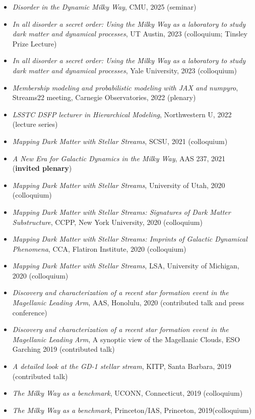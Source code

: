\documentclass[12pt, letterpaper]{apw-cv}
\begin{document}
\begin{itemize}
    \item \emph{Disorder in the Dynamic Milky Way}, CMU, 2025 (seminar)
    \item \emph{In all disorder a secret order: Using the Milky Way as a laboratory to study dark matter and dynamical processes}, UT Austin, 2023 (colloquium; Tinsley Prize Lecture)
    \item \emph{In all disorder a secret order: Using the Milky Way as a laboratory to study dark matter and dynamical processes}, Yale University, 2023 (colloquium)
    \item \emph{Membership modeling and probabilistic modeling with JAX and numpyro}, Streams22 meeting, Carnegie Observatories, 2022 (plenary)
    \item \emph{LSSTC DSFP lecturer in Hierarchical Modeling}, Northwestern U, 2022 (lecture series)
    \item \emph{Mapping Dark Matter with Stellar Streams}, SCSU, 2021 (colloquium)
    \item \emph{A New Era for Galactic Dynamics in the Milky Way}, AAS 237, 2021 (\textbf{invited plenary})
    \item \emph{Mapping Dark Matter with Stellar Streams}, University of Utah, 2020 (colloquium)
    \item \emph{Mapping Dark Matter with Stellar Streams: Signatures of Dark Matter Substructure}, CCPP, New York University, 2020 (colloquium)
    \item \emph{Mapping Dark Matter with Stellar Streams: Imprints of Galactic Dynamical Phenomena}, CCA, Flatiron Institute, 2020 (colloquium)
    \item \emph{Mapping Dark Matter with Stellar Streams}, LSA, University of Michigan, 2020 (colloquium)
    \item \emph{Discovery and characterization of a recent star formation event in the Magellanic Leading Arm}, AAS, Honolulu, 2020 (contributed talk and press conference)
    \item \emph{Discovery and characterization of a recent star formation event in the Magellanic Leading Arm}, A synoptic view of the Magellanic Clouds, ESO Garching 2019 (contributed talk)
    \item \emph{A detailed look at the GD-1 stellar stream}, KITP, Santa Barbara, 2019 (contributed talk)
    \item \emph{The Milky Way as a benchmark}, UCONN, Connecticut, 2019 (colloquium)
    \item \emph{The Milky Way as a benchmark}, Princeton/IAS, Princeton, 2019(colloquium)

\end{itemize}
\end{document}
